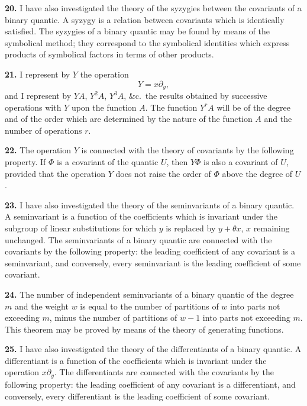 \documentclass[11pt,a4paper]{book}
\begin{document}
\textbf{20.} I have also investigated the theory of the syzygies between the covariants of a binary quantic. A syzygy is a relation between covariants which is identically satisfied. The syzygies of a binary quantic may be found by means of the symbolical method; they correspond to the symbolical identities which express products of symbolical factors in terms of other products.

\newpage
\setcounter{page}{255}

\textbf{21.} I represent by $Y$ the operation
\[
Y = x\partial_y,
\]
and I represent by $YA$, $Y^2A$, $Y^3A$, \&c.\ the results obtained by successive operations with $Y$ upon the function $A$. The function $Y^r A$ will be of the degree and of the order which are determined by the nature of the function $A$ and the number of operations $r$.

\textbf{22.} The operation $Y$ is connected with the theory of covariants by the following property. If $\Phi$ is a covariant of the quantic $U$, then $Y\Phi$ is also a covariant of $U$, provided that the operation $Y$ does not raise the order of $\Phi$ above the degree of $U$.

\textbf{23.} I have also investigated the theory of the seminvariants of a binary quantic. A seminvariant is a function of the coefficients which is invariant under the subgroup of linear substitutions for which $y$ is replaced by $y + \theta x$, $x$ remaining unchanged. The seminvariants of a binary quantic are connected with the covariants by the following property: the leading coefficient of any covariant is a seminvariant, and conversely, every seminvariant is the leading coefficient of some covariant.

\newpage
\setcounter{page}{256}

\textbf{24.} The number of independent seminvariants of a binary quantic of the degree $m$ and the weight $w$ is equal to the number of partitions of $w$ into parts not exceeding $m$, minus the number of partitions of $w-1$ into parts not exceeding $m$. This theorem may be proved by means of the theory of generating functions.

\textbf{25.} I have also investigated the theory of the differentiants of a binary quantic. A differentiant is a function of the coefficients which is invariant under the operation $x\partial_y$. The differentiants are connected with the covariants by the following property: the leading coefficient of any covariant is a differentiant, and conversely, every differentiant is the leading coefficient of some covariant.
\end{document}
